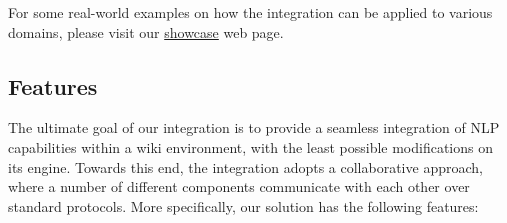 \noindent
For some real-world examples on how the \wikinlp integration can be applied to
various domains, please visit our
\href{http://www.semanticsoftware.info/semantic-assistants-wiki-nlp-showcase}{showcase}
web page.

\subsection{Features}
The ultimate goal of our \wikinlp integration is to provide a seamless integration of NLP capabilities within a wiki environment, with the least possible modifications on its engine. Towards this end, the \wikinlp integration adopts a collaborative approach, where a number of different components communicate with each other over standard protocols. More specifically, our solution has the following features:

